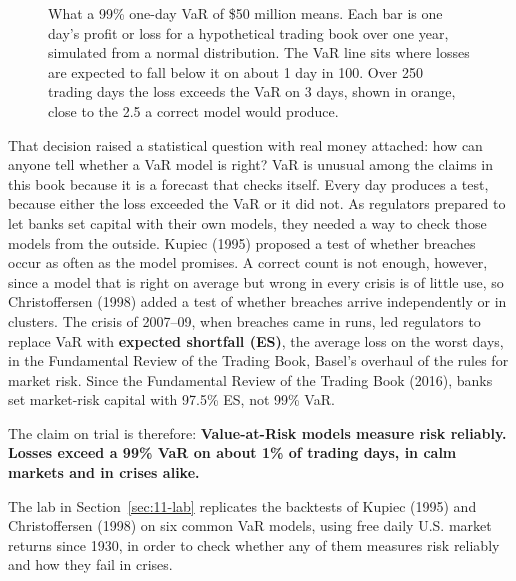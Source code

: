 \begin{figure}[htbp]
\caption{What a 99\% one-day VaR of \$50 million means. Each bar is one day's profit or loss for a hypothetical trading book over one year, simulated from a normal distribution. The VaR line sits where losses are expected to fall below it on about 1 day in 100. Over 250 trading days the loss exceeds the VaR on 3 days, shown in orange, close to the 2.5 a correct model would produce.}
\label{fig:11-var-intro}
\end{figure}


That decision raised a statistical question with real money attached: how can anyone tell whether a VaR model is right? VaR is unusual among the claims in this book because it is a forecast that checks itself. Every day produces a test, because either the loss exceeded the VaR or it did not. As regulators prepared to let banks set capital with their own models, they needed a way to check those models from the outside. Kupiec (1995) proposed a test of whether breaches occur as often as the model promises. A correct count is not enough, however, since a model that is right on average but wrong in every crisis is of little use, so Christoffersen (1998) added a test of whether breaches arrive independently or in clusters. The crisis of 2007--09, when breaches came in runs, led regulators to replace VaR with \textbf{expected shortfall (ES)}, the average loss on the worst days, in the Fundamental Review of the Trading Book, Basel's overhaul of the rules for market risk.
Since the Fundamental Review of the Trading Book (2016), banks set market-risk capital with 97.5\% ES, not 99\% VaR. 


The claim on trial is therefore: \textbf{Value-at-Risk models measure risk reliably. Losses exceed a 99\% VaR on about 1\% of trading days, in calm markets and in crises alike.}

The lab in Section~\ref{sec:11-lab} replicates the backtests of Kupiec (1995) and Christoffersen (1998) on six common VaR models, using free daily U.S. market returns since 1930, in order to check whether any of them measures risk reliably and how they fail in crises.

